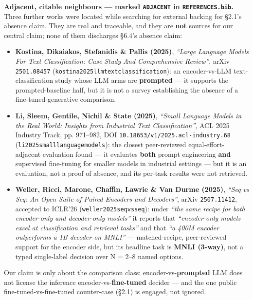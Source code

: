 \documentclass[11pt,a4paper]{article}
\begin{document}
\textbf{Adjacent, citable neighbours --- marked \texttt{ADJACENT} in \texttt{REFERENCES.bib}.} Three further works were located while searching for external backing for \S2.1's absence claim. They are real and traceable, and they are \textbf{not} sources for our central claim; none of them discharges \S6.4's absence claim:

\begin{itemize}
\item \textbf{Kostina, Dikaiakos, Stefanidis \& Pallis (2025)}, \emph{``Large Language Models For Text Classification: Case Study And Comprehensive Review''}, arXiv \texttt{2501.08457} (\texttt{kostina2025llmtextclassification}\cite{kostina2025llmtextclassification}): an encoder-vs-LLM text-classification study whose LLM arms are \textbf{prompted} --- it supports the prompted-baseline half, but it is not a survey establishing the absence of a fine-tuned-generative comparison.
\item \textbf{Li, Sleem, Gentile, Nichil \& State (2025)}, \emph{``Small Language Models in the Real World: Insights from Industrial Text Classification''}, ACL 2025 Industry Track, pp. 971--982, DOI \texttt{10.18653/v1/2025.acl-industry.68} (\texttt{li2025smalllanguagemodels}\cite{li2025smalllanguagemodels}): the closest peer-reviewed equal-effort-adjacent evaluation found --- it evaluates \textbf{both} prompt engineering \textbf{and} supervised fine-tuning for smaller models in industrial settings --- but it is an evaluation, not a proof of absence, and its per-task results were not retrieved.
\item \textbf{Weller, Ricci, Marone, Chaffin, Lawrie \& Van Durme (2025)}, \emph{``Seq vs Seq: An Open Suite of Paired Encoders and Decoders''}, arXiv \texttt{2507.11412}, accepted to ICLR'26 (\texttt{weller2025seqvsseq}\cite{weller2025seqvsseq}): under \emph{``the same recipe for both encoder-only and decoder-only models''} it reports that \emph{``encoder-only models excel at classification and retrieval tasks''} and that \emph{``a 400M encoder outperforms a 1B decoder on MNLI''} --- matched-recipe, peer-reviewed support for the encoder side, but its headline task is \textbf{MNLI (3-way)}, not a typed single-label decision over N = 2--8 named options.
\end{itemize}

Our claim is only about the comparison class: encoder-vs-\textbf{prompted} LLM does not license the inference encoder-vs-\textbf{fine-tuned} decider --- and the one public fine-tuned-vs-fine-tuned counter-case (\S2.1) is engaged, not ignored.
\end{document}
